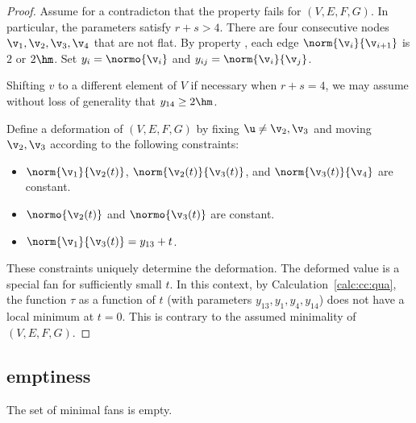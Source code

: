 \begin{proof} 
Assume for a contradicton that the property fails for $(V,E,F,G)$.
In particular, the parameters satisfy $r+s>4$.  There are four
consecutive nodes $\v_1,\v_2,\v_3,\v_4$ that are not flat.  By
property , each edge $\norm{\v_i}{\v_{i+1}}$ is
$2$ or $2\hm$. Set $y_i = \normo{\v_i}$ and $y_{ij} =
\norm{\v_i}{\v_j}$.

Shifting $v$ to a different element of $V$ if necessary when
$r+s=4$, we may assume without loss of generality that $y_{14}\ge
2\hm$.

Define a deformation of $(V,E,F,G)$ by fixing $\u\ne \v_2,\v_3$ and
moving $\v_2,\v_3$ according to the following constraints:
\begin{itemize}
\item $\norm{\v_1}{\v_2(t)}$, $\norm{\v_2(t)}{\v_3(t)}$, and
$\norm{\v_3(t)}{\v_4}$ are constant.
\item $\normo{\v_2(t)}$ and $\normo{\v_3(t)}$ are constant.
\item $\norm{\v_1}{\v_3(t)} = y_{13} + t$.
\end{itemize}
These constraints uniquely determine the deformation. The deformed
value is a special fan for sufficiently small $t$.  In this context,
by Calculation~\ref{calc:cc:qua}, the function $\tau$ as a function of
$t$ (with parameters $y_{13},y_1,y_4,y_{14}$) does not have a local
minimum at $t=0$.  This is contrary to the assumed minimality of
$(V,E,F,G)$.
\end{proof}


\subsection{emptiness}

\begin{lemma}\label{lemma:min-empty}  
The set of minimal fans is empty.
\end{lemma}

